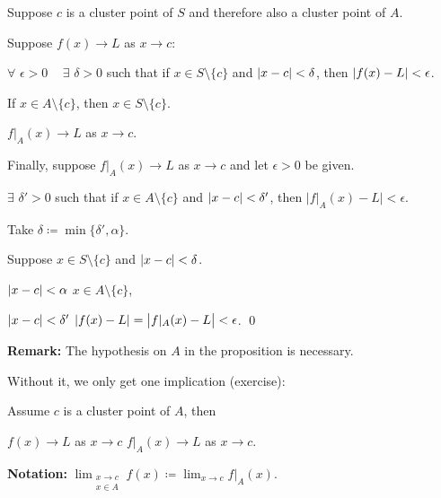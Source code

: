 \documentclass[10pt,aspectratio=169]{beamer}
\begin{document}
\begin{frame}

Suppose $c$ is a cluster point of $S$ and therefore also a cluster point of $A$.

\pause
\medskip

Suppose $f(x) \to L$ as $x \to c$:

\pause
$\forall$ $\epsilon > 0$ ~ $\exists$ $\delta > 0$ such that if $x \in S \setminus \{ c \}$
and $\left\lvert {x-c} \right\rvert < \delta$, then $\left\lvert {f(x)-L} \right\rvert < \epsilon$.

\pause
If $x \in A \setminus \{ c \}$, then $x \in S \setminus \{ c \}$.

\pause
\thus \quad $f|_A(x) \to L$ as $x \to c$.

\pause
\medskip

Finally, suppose $f|_A(x) \to L$ as $x \to c$ and let $\epsilon > 0$ be
given.

\pause
$\exists$ $\delta' > 0$ such that if $x \in A \setminus \{ c \}$
and $\left\lvert {x-c} \right\rvert < \delta'$, then $\bigl\lvert f|_A(x)-L \bigr\rvert < \epsilon$.

\pause
Take $\delta \coloneqq \min \{ \delta', \alpha \}$.

\pause
Suppose $x \in S \setminus \{ c \}$ and
$\left\lvert {x-c} \right\rvert < \delta$.

\pause
$\left\lvert {x-c} \right\rvert < \alpha$ \wthus $x \in A \setminus \{ c \}$,

\pause
$\left\lvert {x-c} \right\rvert < \delta'$ \wthus $\left\lvert {f(x)-L} \right\rvert = \bigl\lvert f|_A(x)-L \bigr\rvert < \epsilon$.
\qed

\pause
\medskip

\textbf{Remark:}
The hypothesis on $A$ in the proposition is necessary.

\pause
Without it, we only get one implication (exercise):

\pause
Assume $c$ is a cluster point of $A$, then

$f(x) \to L$ as $x \to c$
\wthus
$f|_A(x) \to L$ as $x \to c$.

\pause
\medskip

\textbf{Notation:}
\quad $\displaystyle
\lim_{\substack{x \to c\\x \in A}} f(x) \coloneqq \lim_{x \to c} f|_A(x)$.

\end{frame}
\end{document}
